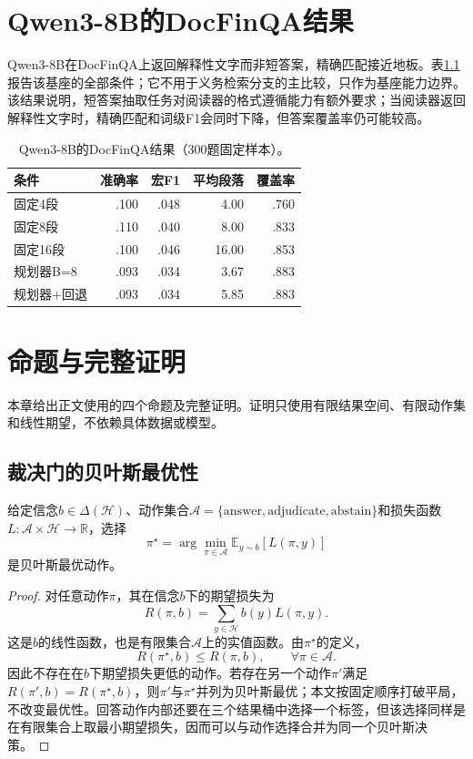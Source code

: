 \chapter{Qwen3-8B的DocFinQA结果}
\label{app:qwen}

Qwen3-8B在DocFinQA上返回解释性文字而非短答案，精确匹配接近地板。表\ref{tab:qwen-doc}报告该基座的全部条件；它不用于义务检索分支的主比较，只作为基座能力边界。该结果说明，短答案抽取任务对阅读器的格式遵循能力有额外要求；当阅读器返回解释性文字时，精确匹配和词级F1会同时下降，但答案覆盖率仍可能较高。

\begin{table}[htbp]
\centering
{}
\setlength{\tabcolsep}{4pt}
\caption{Qwen3-8B的DocFinQA结果（300题固定样本）。}
\label{tab:qwen-doc}
\begin{tabular}{lrrrr}
\toprule
条件 & 准确率 & 宏F1 & 平均段落 & 覆盖率 \\
\midrule
固定4段 & .100 & .048 & 4.00 & .760 \\
固定8段 & .110 & .040 & 8.00 & .833 \\
固定16段 & .100 & .046 & 16.00 & .853 \\
规划器B=8 & .093 & .034 & 3.67 & .883 \\
规划器+回退 & .093 & .034 & 5.85 & .883 \\
\bottomrule
\end{tabular}
\end{table}

\chapter{命题与完整证明}
\label{app:proofs}

本章给出正文使用的四个命题及完整证明。证明只使用有限结果空间、有限动作集和线性期望，不依赖具体数据或模型。

\section{裁决门的贝叶斯最优性}

\begin{proposition}
给定信念$b\in\Delta(\mathcal H)$、动作集合$\mathcal A=\{\text{answer},\text{adjudicate},\text{abstain}\}$和损失函数$L:\mathcal A\times\mathcal H\to\mathbb R$，选择
\[
\pi^\star=\arg\min_{\pi\in\mathcal A}\mathbb E_{y\sim b}[L(\pi,y)]
\]
是贝叶斯最优动作。
\end{proposition}

\begin{proof}
对任意动作$\pi$，其在信念$b$下的期望损失为
\[
R(\pi,b)=\sum_{y\in\mathcal H}b(y)L(\pi,y).
\]
这是$b$的线性函数，也是有限集合$\mathcal A$上的实值函数。由$\pi^\star$的定义，
\[
R(\pi^\star,b)\le R(\pi,b),\qquad \forall \pi\in\mathcal A.
\]
因此不存在在$b$下期望损失更低的动作。若存在另一个动作$\pi'$满足$R(\pi',b)=R(\pi^\star,b)$，则$\pi'$与$\pi^\star$并列为贝叶斯最优；本文按固定顺序打破平局，不改变最优性。回答动作内部还要在三个结果桶中选择一个标签，但该选择同样是在有限集合上取最小期望损失，因而可以与动作选择合并为同一个贝叶斯决策。
\end{proof}

